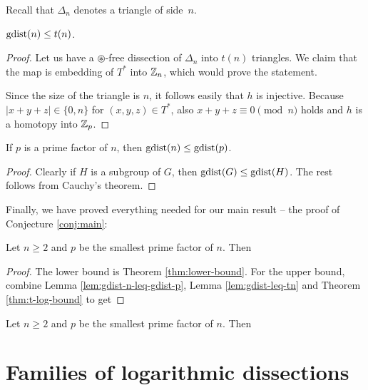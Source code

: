 Recall that $\Delta_n$ denotes a triangle of side~$n$.

\begin{lem}
\label{lem:gdist-leq-tn}
$\mathop{\mathrm{gdist}}(n) \leq t(n)$.
\end{lem}
\begin{proof}
Let us have a $\circledast$-free dissection of $\Delta_n$ into $t(n)$ triangles. We claim that the map
%
is embedding of $T^*$ into $\mathbb Z_n$, which would prove the statement.

Since the size of the triangle is $n$, it follows easily that $h$ is injective. Because $|x+y+z| \in \{0,n\}$ for $(x,y,z)\in T^*$, also $x+y+z \equiv 0 \pmod n$ holds and $h$ is a homotopy into $\mathbb Z_p$.
\end{proof}

\begin{lem}
\label{lem:gdist-n-leq-gdist-p}
If $p$ is a prime factor of $n$, then $\mathop{\mathrm{gdist}}(n) \leq \mathop{\mathrm{gdist}}(p)$.
\end{lem}%
\begin{proof}
Clearly if $H$ is a subgroup of $G$, then $\mathop{\mathrm{gdist}}(G) \leq \mathop{\mathrm{gdist}}(H)$. The rest follows from Cauchy's theorem.
\end{proof}

Finally, we have proved everything needed for our main result -- the proof of Conjecture \ref{conj:main}:

\begin{thm}
\label{cor:conj-proof}
Let $n \geq 2$ and $p$ be the smallest prime factor of $n$. Then
\end{thm}%
\begin{proof}
The lower bound is Theorem \ref{thm:lower-bound}. For the upper bound, combine Lemma \ref{lem:gdist-n-leq-gdist-p}, Lemma \ref{lem:gdist-leq-tn} and Theorem \ref{thm:t-log-bound} to get
\end{proof}

\begin{cor}
\label{cor:constants}
Let $n \geq 2$ and $p$ be the smallest prime factor of $n$. Then
\end{cor}%

\section{Families of logarithmic dissections}
\label{sec:other-log-dissections}


